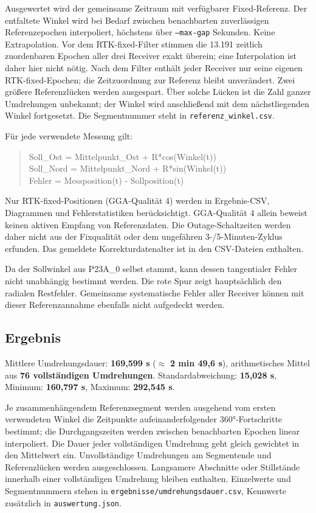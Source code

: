 \documentclass[11pt,a4paper]{article}
\begin{document}
Ausgewertet wird der gemeinsame Zeitraum mit verfügbarer Fixed-Referenz. Der entfaltete Winkel wird bei Bedarf zwischen benachbarten zuverlässigen Referenzepochen interpoliert, höchstens über {\small\texttt{--max-gap}} Sekunden. Keine Extrapolation. Vor dem RTK-fixed-Filter stimmen die 13.191 zeitlich zuordenbaren Epochen aller drei Receiver exakt überein; eine Interpolation ist daher hier nicht nötig. Nach dem Filter enthält jeder Receiver nur seine eigenen RTK-fixed-Epochen; die Zeitzuordnung zur Referenz bleibt unverändert. Zwei größere Referenzlücken werden ausgespart. Über solche Lücken ist die Zahl ganzer Umdrehungen unbekannt; der Winkel wird anschließend mit dem nächstliegenden Winkel fortgesetzt. Die Segmentnummer steht in {\small\texttt{referenz\_\allowbreak{}winkel.csv}}.

Für jede verwendete Messung gilt:

\begin{quote}\ttfamily\footnotesize Soll\_Ost  = Mittelpunkt\_Ost  + R*cos(Winkel(t))\\Soll\_Nord = Mittelpunkt\_Nord + R*sin(Winkel(t))\\Fehler    = Messposition(t) - Sollposition(t)\end{quote}

Nur RTK-fixed-Positionen (GGA-Qualität 4) werden in Ergebnis-CSV, Diagrammen und Fehlerstatistiken berücksichtigt. GGA-Qualität 4 allein beweist keinen aktiven Empfang von Referenzdaten. Die Outage-Schaltzeiten werden daher nicht aus der Fixqualität oder dem ungefähren 3-/5-Minuten-Zyklus erfunden. Das gemeldete Korrekturdatenalter ist in den CSV-Dateien enthalten.

Da der Sollwinkel aus P23A\_0 selbst stammt, kann dessen tangentialer Fehler nicht unabhängig bestimmt werden. Die rote Spur zeigt hauptsächlich den radialen Restfehler. Gemeinsame systematische Fehler aller Receiver können mit dieser Referenzannahme ebenfalls nicht aufgedeckt werden.

\subsection{Ergebnis}

Mittlere Umdrehungsdauer: \textbf{169,599 s} (\ensuremath{\approx} \textbf{2 min 49,6 s}), arithmetisches Mittel aus \textbf{76 vollständigen Umdrehungen}. Standardabweichung: \textbf{15,028 s}, Minimum: \textbf{160,797 s}, Maximum: \textbf{292,545 s}.

Je zusammenhängendem Referenzsegment werden ausgehend vom ersten verwendeten Winkel die Zeitpunkte aufeinanderfolgender 360°-Fortschritte bestimmt; die Durchgangszeiten werden zwischen benachbarten Epochen linear interpoliert. Die Dauer jeder vollständigen Umdrehung geht gleich gewichtet in den Mittelwert ein. Unvollständige Umdrehungen am Segmentende und Referenzlücken werden ausgeschlossen. Langsamere Abschnitte oder Stillstände innerhalb einer vollständigen Umdrehung bleiben enthalten. Einzelwerte und Segmentnummern stehen in {\small\texttt{ergebnisse/\allowbreak{}umdrehungsdauer.csv}}, Kennwerte zusätzlich in {\small\texttt{auswertung.json}}.
\end{document}
